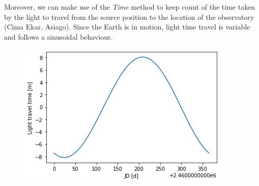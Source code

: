\documentclass[a4paper,11pt,twocolumn]{article}
\begin{document}
Moreover, we can make use of the \textit{Time} method to keep count of the time 
taken by the light to travel from the source position to the location of the 
observatory (Cima Ekar, Asiago). Since the Earth is in motion, light time 
travel is variable and follows a sinusoidal behaviour.
\begin{figure}[H]
    \centering  
    \includegraphics[scale=0.55, angle=0]{../pictures/time_corr.png}
\end{figure}


\printbibliography
\end{document}
